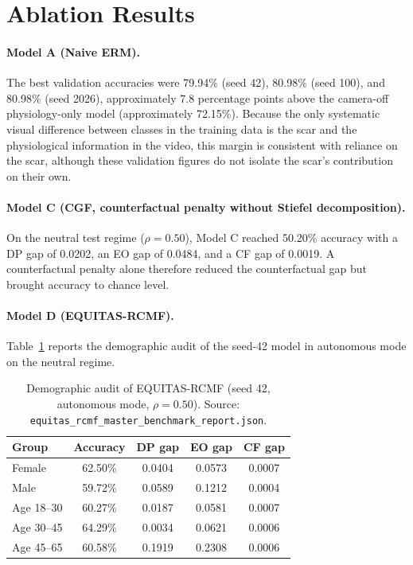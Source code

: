 \section{Ablation Results}
\paragraph{Model A (Naive ERM).} The best validation accuracies were 79.94\% (seed 42), 80.98\% (seed 100), and 80.98\% (seed 2026), approximately 7.8 percentage points above the camera-off physiology-only model (approximately 72.15\%). Because the only systematic visual difference between classes in the training data is the scar and the physiological information in the video, this margin is consistent with reliance on the scar, although these validation figures do not isolate the scar's contribution on their own.

\paragraph{Model C (CGF, counterfactual penalty without Stiefel decomposition).} On the neutral test regime ($\rho = 0.50$), Model C reached 50.20\% accuracy with a DP gap of 0.0202, an EO gap of 0.0484, and a CF gap of 0.0019. A counterfactual penalty alone therefore reduced the counterfactual gap but brought accuracy to chance level.

\paragraph{Model D (EQUITAS-RCMF).} Table~\ref{tab:demographic_audit} reports the demographic audit of the seed-42 model in autonomous mode on the neutral regime.

\begin{table}[htbp]
\centering
\begin{tabular}{@{}lcccc@{}}
\toprule
\textbf{Group} & \textbf{Accuracy} & \textbf{DP gap} & \textbf{EO gap} & \textbf{CF gap} \\
\midrule
Female & 62.50\% & 0.0404 & 0.0573 & 0.0007 \\
Male & 59.72\% & 0.0589 & 0.1212 & 0.0004 \\
Age 18--30 & 60.27\% & 0.0187 & 0.0581 & 0.0007 \\
Age 30--45 & 64.29\% & 0.0034 & 0.0621 & 0.0006 \\
Age 45--65 & 60.58\% & 0.1919 & 0.2308 & 0.0006 \\
\bottomrule
\end{tabular}
\caption{Demographic audit of EQUITAS-RCMF (seed 42, autonomous mode, $\rho = 0.50$). Source: \texttt{equitas\_rcmf\_master\_benchmark\_report.json}.}
\label{tab:demographic_audit}
\end{table}

